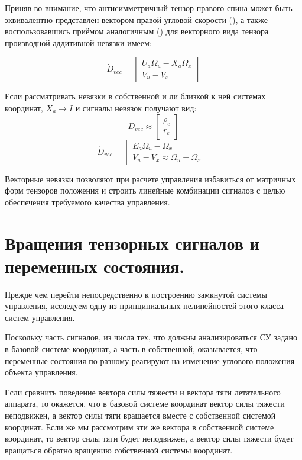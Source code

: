 \documentclass[a4paper]{article}
\begin{document}
Приняв во внимание, что антисимметричный тензор правого спина может быть эквивалентно представлен вектором правой угловой скорости (), а также воспользовавшись приёмом аналогичным () для векторного вида тензора производной аддитивной невязки имеем:

\begin{equation}\dot{D}_{vec} = \begin{bmatrix}U_a\Omega_u-X_a\Omega_x\\ V_u-V_x\end{bmatrix}\end{equation}

Если рассматривать невязки в собственной и ли близкой к ней системах координат, $X_a\rightarrow I$ и сигналы невязок получают вид:
\begin{equation} D_{vec} \approx \begin{bmatrix}\rho_e\\r_e\end{bmatrix} \end{equation}
\begin{equation}\dot{D}_{vec} = \begin{bmatrix}E_a\Omega_u-\Omega_x\\ V_u-V_x \approx \Omega_u-\Omega_x \end{bmatrix}\end{equation}

Векторные невязки позволяют при расчете управления избавиться от матричных форм тензоров положения и строить линейные комбинации сигналов с целью обеспечения требуемого качества управления.

\section{Вращения тензорных сигналов и переменных состояния.}
Прежде чем перейти непосредственно к построению замкнутой системы управления, исследуем одну из принципиальных нелинейностей этого класса систем управления.

Поскольку часть сигналов, из числа тех, что должны анализироваться СУ задано в базовой системе координат, а часть в собственной, оказывается, что переменные состояния по разному реагируют на изменение углового положения объекта управления. 

Если сравнить поведение вектора силы тяжести и вектора тяги летательного аппарата, то окажется, что в базовой системе координат вектор силы тяжести неподвижен, а вектор силы тяги вращается вместе с собственной системой координат. Если же мы рассмотрим эти же вектора в собственной системе координат, то вектор силы тяги будет неподвижен, а вектор силы тяжести будет вращаться обратно вращению собственной системы координат.
\end{document}
